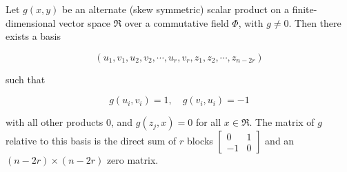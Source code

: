 Let $g(x, y)$ be an alternate (skew symmetric) scalar product on a finite-dimensional vector space $\mathfrak{R}$ over a commutative field $\Phi$, with $g \neq 0$. Then there exists a basis

$$(u_1, v_1, u_2, v_2, \cdots, u_r, v_r, z_1, z_2, \cdots, z_{n-2r})$$

such that

$$g(u_i, v_i) = 1, \quad g(v_i, u_i) = -1$$

with all other products $0$, and $g(z_j, x) = 0$ for all $x \in \mathfrak{R}$. The matrix of $g$ relative to this basis is the direct sum of $r$ blocks $\begin{bmatrix} 0 & 1 \\ -1 & 0 \end{bmatrix}$ and an $(n-2r) \times (n-2r)$ zero matrix.
